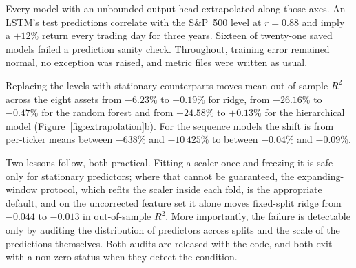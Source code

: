 Every model with an unbounded output head extrapolated along those axes. An
LSTM's test predictions correlate with the S\&P~500 level at $r=0.88$ and imply a
$+12\%$ return every trading day for three years. Sixteen of twenty-one saved
models failed a prediction sanity check. Throughout, training error remained
normal, no exception was raised, and metric files were written as usual.

Replacing the levels with stationary counterparts moves mean out-of-sample $R^2$
across the eight assets from $-6.23\%$ to $-0.19\%$ for ridge, from $-26.16\%$
to $-0.47\%$ for the random forest and from $-24.58\%$ to $+0.13\%$ for the
hierarchical model (Figure~\ref{fig:extrapolation}b). For the sequence models
the shift is from per-ticker means between $-638\%$ and $-10\,425\%$ to between
$-0.04\%$ and $-0.09\%$.

Two lessons follow, both practical. Fitting a scaler once and freezing it is
safe only for stationary predictors; where that cannot be guaranteed, the
expanding-window protocol, which refits the scaler inside each fold, is the
appropriate default, and on the uncorrected feature set it alone moves
fixed-split ridge from $-0.044$ to $-0.013$ in out-of-sample $R^2$. More
importantly, the failure is detectable only by auditing the distribution of
predictors across splits and the scale of the predictions themselves. Both
audits are released with the code, and both exit with a non-zero status when
they detect the condition.
